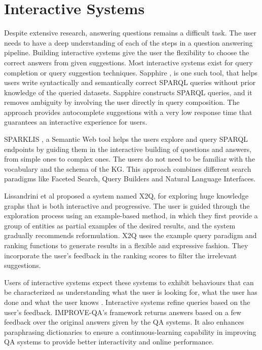 \section{Interactive Systems}
Despite extensive research, answering questions remains a difficult task. The user needs to have a deep understanding of each of the steps in a question answering pipeline. Building interactive systems give the user the flexibility to choose the correct answers from given suggestions. Most interactive systems exist for query completion or query suggestion techniques. Sapphire \cite{sapphire}, is one such tool, that helps users write syntactically and semantically correct SPARQL queries without prior knowledge of the queried datasets. Sapphire constructs SPARQL queries, and it removes ambiguity by involving the user directly in query composition. The approach provides autocomplete suggestions with a very low response time that guarantees an interactive experience for users. 

SPARKLIS \cite{sparklis}, a Semantic Web tool helps the users explore and query SPARQL endpoints by guiding them in the
interactive building of questions and answers, from simple ones to complex ones. The users do not need to be familiar with the vocabulary and the schema of the KG. This approach combines different search paradigms like Faceted Search, Query Builders and Natural Language Interfaces. 

Lissandrini et al \cite{x2q} proposed a system named X2Q, for exploring huge knowledge graphs that is both interactive and progressive. The user is guided through the exploration process using an example-based method, in which they first provide a group of entities as partial examples of the desired results, and the system gradually recommends reformulation. X2Q uses the example query paradigm and ranking functions to generate results in a flexible and expressive fashion. They incorporate the user's feedback in the ranking scores to filter the irrelevant suggestions.

Users of interactive systems expect these systems to exhibit behaviours that can be characterized as understanding what the user is looking for, what the user has done and what the user knows \cite{10.5555/1641579.1641586}. Interactive systems refine queries based on the user’s feedback. IMPROVE-QA's \cite{10.1145/3357384.3358059} framework returns answers based on a few feedback over the original answers given by the QA systems. It also enhances paraphrasing dictionaries to ensure a continuous-learning capability in improving QA systems to provide better interactivity and online performance.

